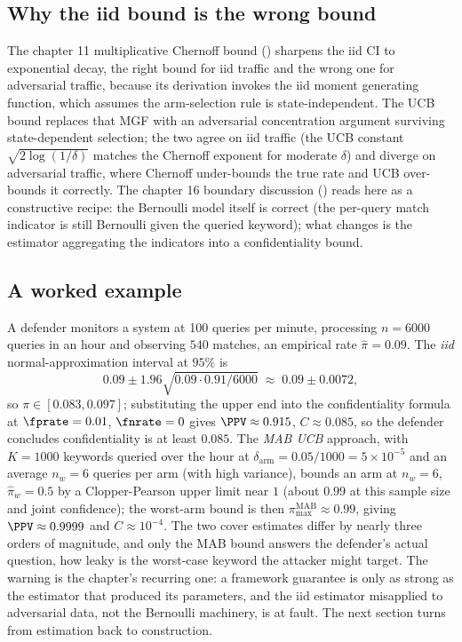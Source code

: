 \subsection*{Why the iid bound is the wrong bound}

The chapter 11 multiplicative Chernoff bound ()
sharpens the iid CI to exponential decay, the right bound for iid traffic
and the wrong one for adversarial traffic, because its derivation invokes
the iid moment generating function, which assumes the arm-selection rule
is state-independent. The UCB bound replaces that MGF with an adversarial
concentration argument surviving state-dependent selection; the two agree
on iid traffic (the UCB constant $\sqrt{2\log(1/\delta)}$ matches the
Chernoff exponent for moderate $\delta$) and diverge on adversarial
traffic, where Chernoff under-bounds the true rate and UCB over-bounds it
correctly. The chapter 16 boundary discussion ()
reads here as a constructive recipe: the Bernoulli model itself is correct
(the per-query match indicator is still Bernoulli given the queried
keyword); what changes is the estimator aggregating the indicators into a
confidentiality bound.

\subsection*{A worked example}

A defender monitors a system at 100 queries per minute, processing $n =
6000$ queries in an hour and observing $540$ matches, an empirical rate
$\hat\pi = 0.09$. The \emph{iid} normal-approximation interval at $95\%$ is
\[
  0.09 \pm 1.96 \sqrt{0.09 \cdot 0.91 / 6000} \;\approx\; 0.09 \pm 0.0072,
\]
so $\pi \in [0.083, 0.097]$; substituting the upper end into the
confidentiality formula at $\fprate = 0.01$, $\fnrate = 0$ gives $\PPV
\approx 0.915$, $C \approx 0.085$, so the defender concludes
confidentiality is at least $0.085$. The \emph{MAB UCB} approach, with $K
= 1000$ keywords queried over the hour at $\delta_{\mathrm{arm}} =
0.05/1000 = 5 \times 10^{-5}$ and an average $n_w = 6$ queries per arm
(with high variance), bounds an arm at $n_w = 6$, $\hat\pi_w = 0.5$ by a
Clopper-Pearson upper limit near $1$ (about $0.99$ at this sample size and
joint confidence); the worst-arm bound is then $\pi^{\mathrm{MAB}}_{\max}
\approx 0.99$, giving $\PPV \approx 0.9999$ and $C \approx 10^{-4}$. The two cover estimates differ by nearly three orders of magnitude, and
only the MAB bound answers the defender's actual question, how leaky is the worst-case keyword the
attacker might target. The warning is the chapter's recurring one: a
framework guarantee is only as strong as the estimator that produced its
parameters, and the iid estimator misapplied to adversarial data, not the
Bernoulli machinery, is at fault. The next section turns from estimation
back to construction.
